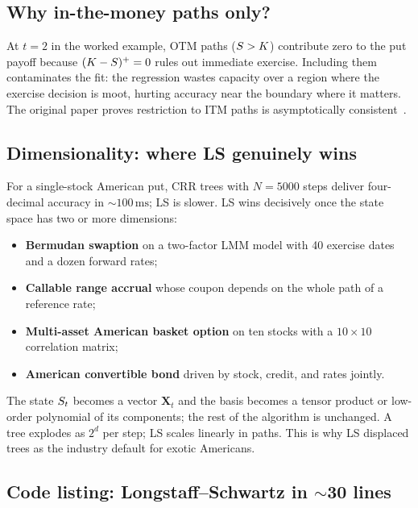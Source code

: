 \subsection{Why in-the-money paths only?}

At $t=2$ in the worked example, OTM paths ($S > K$)
contribute zero to the put payoff because $(K - S)^+ = 0$
rules out immediate exercise.  Including them contaminates the fit:
the regression wastes capacity over a region where the exercise
decision is moot, hurting accuracy near the boundary where it matters.
The original paper proves restriction to ITM paths is asymptotically
consistent~\citep{longstaffschwartz2001}.

\subsection{Dimensionality: where LS genuinely wins}

For a single-stock American put, CRR trees with $N=5000$ steps
deliver four-decimal accuracy in $\sim 100\,\mathrm{ms}$; LS is
slower.  LS wins decisively once the state space has two or more
dimensions:
\begin{itemize}
  \item \textbf{Bermudan swaption} on a two-factor LMM model with
    40 exercise dates and a dozen forward rates;
  \item \textbf{Callable range accrual} whose coupon depends on the
    whole path of a reference rate;
  \item \textbf{Multi-asset American basket option} on ten stocks
    with a $10 \times 10$ correlation matrix;
  \item \textbf{American convertible bond} driven by stock, credit,
    and rates jointly.
\end{itemize}
The state $S_t$ becomes a vector $\bm{X}_t$ and the basis becomes
a tensor product or low-order polynomial of its components; the rest
of the algorithm is unchanged.  A tree explodes as $2^d$ per step;
LS scales linearly in paths.  This is why LS displaced trees as the
industry default for exotic Americans.

\subsection{Code listing: Longstaff--Schwartz in $\sim$30 lines}

